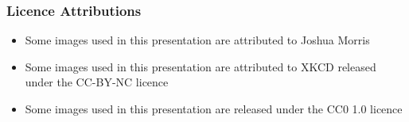\begin{frame}
\frametitle{Licence Attributions}
\begin{itemize}
\item Some images used in this presentation are attributed to Joshua Morris
\item Some images used in this presentation are attributed to XKCD released under the CC-BY-NC licence
\item Some images used in this presentation are released under the CC0 1.0 licence
\end{itemize}
\end{frame}
